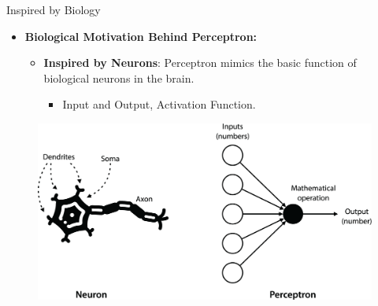 \documentclass[serif, aspectratio=169]{beamer}
\begin{document}
\begin{frame}{Inspired by Biology}
    \begin{itemize}
        \item \textbf{Biological Motivation Behind Perceptron:}
        \medskip
        \begin{itemize}\itemsep1em
            \item \justifying \textbf{Inspired by Neurons}:
            Perceptron mimics the basic function of biological neurons in the brain.
            \begin{itemize}
                \item \justifying Input and Output, Activation Function.
            \end{itemize}
        \end{itemize}
    \end{itemize}
    \begin{figure}
        \centering
        \includegraphics[width=0.55\linewidth]{pic/Figure_19.png}
    \end{figure}
    \vfill
\end{frame}
\end{document}
